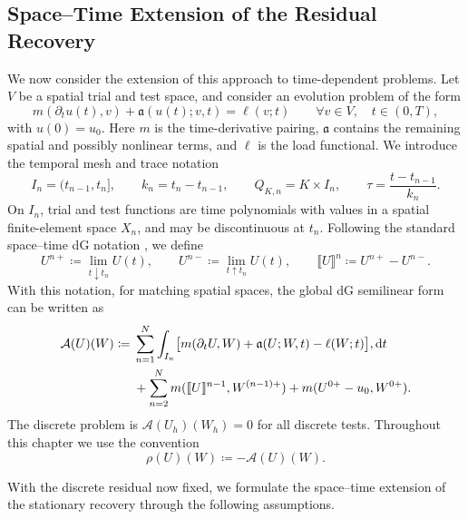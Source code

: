 \subsection{Space--Time Extension of the Residual Recovery}
\label{sec:space-time-residual-recovery}

We now consider the extension of this approach to time-dependent problems.
Let \(V\) be a spatial trial and test space, and consider an evolution problem of the form
\begin{equation}
  m(\partial_tu(t),v)+\mathfrak a(u(t);v,t)=\ell(v;t)
  \qquad\forall v\in V,\quad t\in(0,T),
  \label{eq:abstract-evolution-problem}
\end{equation}
with \(u(0)=u_0\). Here \(m\) is the time-derivative pairing, \(\mathfrak a\) contains the remaining spatial and possibly nonlinear terms, and \(\ell\) is the load functional. We introduce the temporal mesh and trace notation
\begin{equation}
  I_n=(t_{n-1},t_n],
  \qquad k_n=t_n-t_{n-1},
  \qquad Q_{K,n}=K\times I_n,
  \qquad \tau=\frac{t-t_{n-1}}{k_n}.
  \label{eq:space-time-cell}
\end{equation}
On \(I_n\), trial and test functions are time polynomials with values in a spatial finite-element space \(X_n\), and may be discontinuous at \(t_n\). Following the standard space--time dG notation \cite{Bangerth_Rannacher_2003}, we define
\begin{equation}
  U^{n+}\coloneqq\lim_{t\downarrow t_n}U(t),
  \qquad
  U^{n-}\coloneqq\lim_{t\uparrow t_n}U(t),
  \qquad
  \llbracket U \rrbracket^n\coloneqq U^{n+}-U^{n-}.
  \label{eq:dg-time-traces}
\end{equation}
With this notation, for matching spatial spaces, the global dG semilinear form can be written as
\begin{align}
  \mathcal A(U)(W)
  \coloneqq{}&
  \sum_{n=1}^{N}\int_{I_n}
  \bigl[m(\partial_tU,W)+\mathfrak a(U;W,t)-\ell(W;t)\bigr],\mathrm dt
  \notag\\
  &+\sum_{n=2}^{N}m(\llbracket U \rrbracket^{n-1},W^{(n-1)+})
  +m(U^{0+}-u_0,W^{0+}).
  \label{eq:global-dg-semilinear-form}
\end{align}
The discrete problem is \(\mathcal A(U_h)(W_h)=0\) for all discrete tests. Throughout this chapter we use the convention
\begin{equation}
  \rho(U)(W)\coloneqq-\mathcal A(U)(W).
  \label{eq:dg-residual-sign-convention}
\end{equation}

With the discrete residual now fixed, we formulate the space--time extension of the stationary recovery through the following assumptions.


